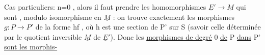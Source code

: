 Cas particuliers:  n=0 , alors  il faut prendre  les  homomorphismes
$\underline{E}' \to \underline{M}$  qui sont , modulo isomorphisme en $\underline{M}$ : on trouve
exactement les  morphismes  $g\colon P \to P'$  de la forme  hf , où  h est une
section de  P' sur S  (savoir celle déterminée par  le quotient inversible
$\underline{M}$ de $\underline{E}'$). Donc les \uline{morphismes de  degré} 0  \uline{de} P \uline{dans} P' \uline{sont les morphis-}%


